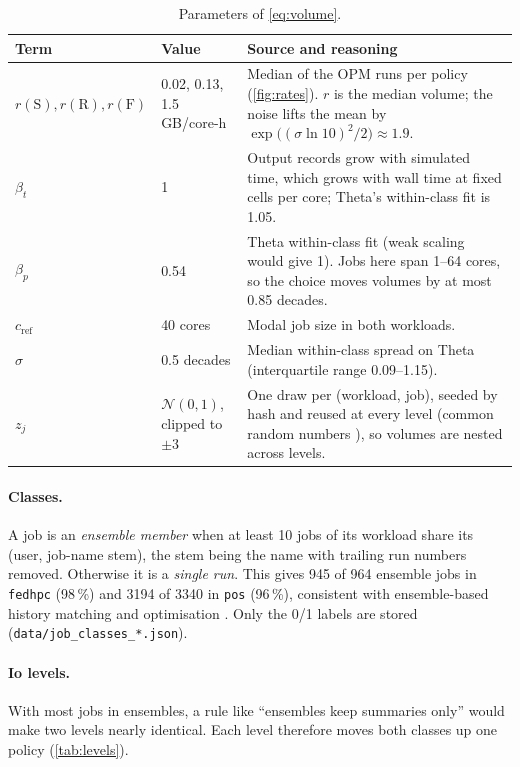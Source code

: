 \documentclass[11pt,a4paper]{article}
\newcommand{\code}[1]{\texttt{#1}}
\begin{document}
\begin{table}[ht]
\centering\small
\caption{Parameters of \cref{eq:volume}.}\label{tab:params}
\begin{tabularx}{\linewidth}{llX}
\toprule
Term & Value & Source and reasoning \\
\midrule
$r(\mathrm{S}), r(\mathrm{R}), r(\mathrm{F})$ & 0.02, 0.13, 1.5 GB/core-h &
  Median of the OPM runs per policy (\cref{fig:rates}). $r$ is the median volume;
  the noise lifts the mean by $\exp\bigl((\sigma\ln 10)^2/2\bigr)\approx 1.9$. \\
$\beta_t$ & 1 & Output records grow with simulated time, which grows with wall time
  at fixed cells per core; Theta's within-class fit is 1.05. \\
$\beta_p$ & 0.54 & Theta within-class fit (weak scaling would give 1). Jobs here
  span 1--64 cores, so the choice moves volumes by at most 0.85 decades. \\
$c_{\mathrm{ref}}$ & 40 cores & Modal job size in both workloads. \\
$\sigma$ & 0.5 decades & Median within-class spread on Theta (interquartile range
  0.09--1.15). \\
$z_j$ & $\mathcal N(0,1)$, clipped to $\pm 3$ & One draw per (workload, job), seeded
  by hash and reused at every level (common random numbers \citep{law2015simulation}),
  so volumes are nested across levels. \\
\bottomrule
\end{tabularx}
\end{table}

\paragraph{Classes.} A job is an \emph{ensemble member} when at least 10 jobs of
its workload share its (user, job-name stem), the stem being the name with trailing
run numbers removed. Otherwise it is a \emph{single run}. This gives 945 of 964
ensemble jobs in \code{fedhpc} (98\,\%) and \num{3194} of \num{3340} in \code{pos}
(96\,\%), consistent with ensemble-based history matching and optimisation
\citep{oliver2011recent}. Only the 0/1 labels are stored
(\code{data/job\_classes\_*.json}).

\paragraph{Io levels.} With most jobs in ensembles, a rule like ``ensembles keep
summaries only'' would make two levels nearly identical. Each level therefore moves
both classes up one policy (\cref{tab:levels}).
\end{document}
